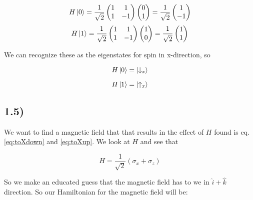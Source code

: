 \documentclass[a4paper,norsk, 10pt]{article}
\begin{document}
\begin{equation}
H\ket{0} = 
\frac{1}{\sqrt{2}}
\begin{pmatrix}
1 & 1 \\
1 & -1
\end{pmatrix}
\begin{pmatrix}
0 \\1
\end{pmatrix}
= \frac{1}{\sqrt{2}}
\begin{pmatrix}
1 \\ -1
\end{pmatrix}
\end{equation}
\begin{equation}
H\ket{1} = 
\frac{1}{\sqrt{2}}
\begin{pmatrix}
1 & 1 \\
1 & -1
\end{pmatrix}
\begin{pmatrix}
1 \\ 0
\end{pmatrix}
= \frac{1}{\sqrt{2}}
\begin{pmatrix}
1 \\ 1
\end{pmatrix}
\end{equation}


We can recognize these as the eigenstates for spin in x-direction, so

\begin{equation}
H\ket{0} = \ket{\downarrow_x}
\end{equation}\label{eq:toXdown}

\begin{equation}
H\ket{1} = \ket{\uparrow_x}
\end{equation}\label{eq:toXup}


\subsection{1.5)}
We want to find a magnetic field that that results in the effect of $H$ found is eq. \eqref{eq:toXdown} and \eqref{eq:toXup}. We look at $H$ and see that

\begin{equation}
H = \frac{1}{\sqrt{2}}\left(\sigma_x + \sigma_z\right)
\end{equation}

So we make an educated guess that the magnetic field has to we in $\hat{i} + \hat{k}$ direction. So our Hamiltonian for the magnetic field will be:
\end{document}
